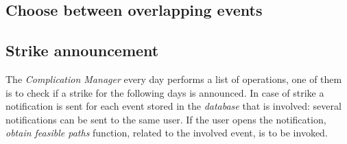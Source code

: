 \subsection{Choose between overlapping events}
		\noindent{}
\subsection{Strike announcement}
		\noindent{}
		The \textit{Complication Manager} every day performs a list of operations, one of them is to check if a strike for the following days is announced. 
		In case of strike a notification is sent for each event stored in the \textit{database} that is involved: several notifications can be sent to the same user. 
		If the user opens the notification, \textit{obtain feasible paths} function, related to the involved event, is to be invoked.